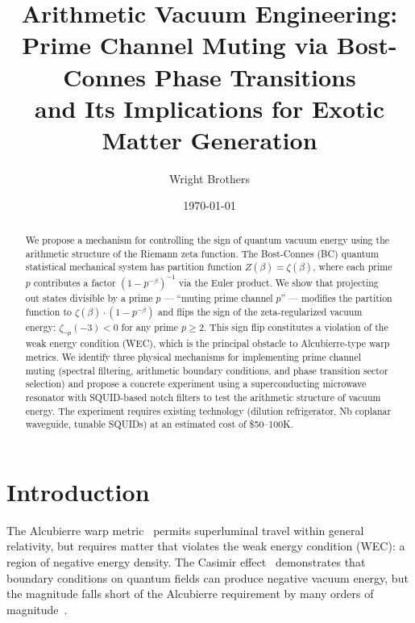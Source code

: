 \documentclass[aps,prd,twocolumn,superscriptaddress,nofootinbib]{revtex4-2}
\begin{document}
\title{Arithmetic Vacuum Engineering:\\
  Prime Channel Muting via Bost-Connes Phase Transitions\\
  and Its Implications for Exotic Matter Generation}

\author{Wright Brothers}
\date{\today}

\begin{abstract}
We propose a mechanism for controlling the sign of quantum vacuum energy
using the arithmetic structure of the Riemann zeta function.
The Bost-Connes (BC) quantum statistical mechanical system has
partition function $Z(\beta) = \zeta(\beta)$, where each prime $p$
contributes a factor $(1 - p^{-\beta})^{-1}$ via the Euler product.
We show that projecting out states divisible by a prime $p$ ---
``muting prime channel $p$'' --- modifies the partition function to
$\zeta(\beta) \cdot (1 - p^{-\beta})$ and flips the sign of the
zeta-regularized vacuum energy: $\zeta_{\neg p}(-3) < 0$ for any prime $p \geq 2$.
This sign flip constitutes a violation of the weak energy condition (WEC),
which is the principal obstacle to Alcubierre-type warp metrics.
We identify three physical mechanisms for implementing prime channel muting
(spectral filtering, arithmetic boundary conditions, and phase transition
sector selection) and propose a concrete experiment using a superconducting
microwave resonator with SQUID-based notch filters to test the
arithmetic structure of vacuum energy.
The experiment requires existing technology (dilution refrigerator,
Nb coplanar waveguide, tunable SQUIDs) at an estimated cost of \$50--100K.
\end{abstract}

\maketitle

\section{Introduction}
\label{sec:intro}

The Alcubierre warp metric~\cite{Alcubierre1994} permits superluminal
travel within general relativity, but requires matter that violates the
weak energy condition (WEC): a region of negative energy density.
The Casimir effect~\cite{Casimir1948} demonstrates that boundary conditions
on quantum fields can produce negative vacuum energy, but
the magnitude falls short of the Alcubierre requirement by many
orders of magnitude~\cite{PfenningFord1997}.
\end{document}
